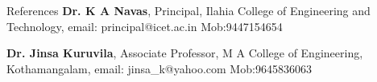 
\prefix{}
\begin{rubric}{References}
\entry*[] \textbf{Dr. K A Navas},  Principal, Ilahia College of 
Engineering and Technology, email: principal@icet.ac.in Mob:9447154654\par

\entry*[] \textbf{Dr. Jinsa Kuruvila},  Associate Professor, M A College of Engineering, Kothamangalam, email: jinsa\_k@yahoo.com Mob:9645836063\par
\end{rubric}
